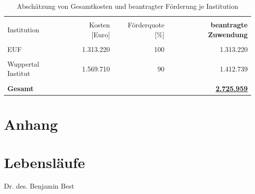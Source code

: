\documentclass[a4paper,11pt,twoside]{scrartcl}
\begin{document}
\begin{table}[h]
\small
\begin{center}
  \caption{Abschätzung von Gesamtkosten und beantragter Förderung je Institution}
\begin{tabular}[h]{|l | r | r | r|}
\hline
&&&\\
Institution & Kosten [Euro] & Förderquote [\%] & \textbf{beantragte Zuwendung}\\
\hline
\hline
 &&&\\
 EUF & 1.313.220 & 100 & 1.313.220\\
 \hline
 &&&\\
 Wuppertal Institut & 1.569.710 & 90 & 1.412.739
\\
 \hline
 \hline
 &&&\\
 \textbf{Gesamt} & & &\underline{\textbf{2.725.959}}\\
 \hline
 \end{tabular}
 \label{tab:kostenkalkulation2}
\end{center}
\end{table}

\clearpage
\footnotesize
%
%
%

%
%
%
%
%

\iffalse
\clearpage
\appendix

\section{Anhang}




\section{Lebensläufe}

Dr. des. Benjamin Best 
\end{document}
